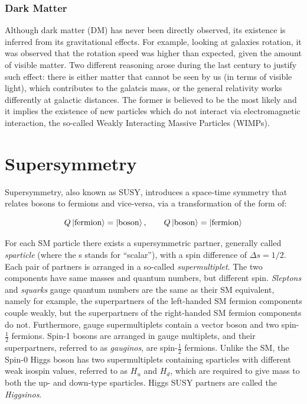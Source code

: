 		\subsubsection*{Dark Matter}

			Although dark matter (DM) has never been directly observed, its existence is inferred from its gravitational effects. For example, looking at galaxies rotation, it was observed that the rotation speed was higher than expected, given the amount of visible matter. Two different reasoning arose during the last century to justify such effect: there is either matter that cannot be seen by us (in terms of visible light), which contributes to the galatcis mass, or the general relativity works differently at galactic distances. The former is believed to be the most likely and it implies the existence of new particles which do not interact via electromagnetic interaction, the so-called Weakly Interacting Massive Particles (WIMPs).







	\section{Supersymmetry}
	\label{sec:SUSY}
		
		Supersymmetry, also known as SUSY, introduces a space-time symmetry that relates bosons to fermions and vice-versa, via a transformation of the form of:  

		\begin{equation}
		\label{eq:susy_transformation}
			Q \ket{\mathrm{fermion}} = \ket{\mathrm{boson}}, \qquad Q \ket{\mathrm{boson}} = \ket{\mathrm{fermion}}
		\end{equation}

		\noindent For each SM particle there exists a supersymmetric partner, generally called \textit{sparticle} (where the s stands for “scalar”), with a spin difference of $\Delta s = 1/2$. Each pair of partners is arranged in a so-called \textit{supermultiplet}. The two components have same masses and quantum numbers, but different spin. \textit{Sleptons} and \textit{squarks} gauge quantum numbers are the same as their SM equivalent, namely for example, the superpartners of the left-handed SM fermion components couple weakly, but the superpartners of the right-handed SM fermion components do not. Furthermore, gauge supermultiplets contain a vector boson and two spin-$\frac{1}{2}$ fermions. Spin-1 bosons are arranged in gauge multiplets, and their superpartners, referred to as \textit{gauginos}, are spin-$\frac{1}{2}$ fermions. Unlike the SM, the Spin-0 Higgs boson has two supermultiplets containing sparticles with different weak isospin values, referred to as $H_u$ and $H_d$, which are required to give mass to both the up- and down-type sparticles. Higgs SUSY partners are called the \textit{Higgsinos}.

